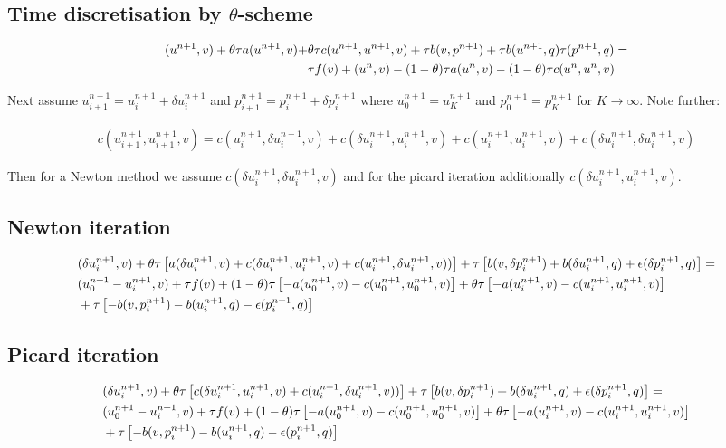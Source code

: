 \documentclass[11pt]{article}
\begin{document}
\subsection{Time discretisation by $\theta$-scheme}
\begin{align}
	(u^{n+1}, v) + \theta \tau a(u^{n+1}, v) +& \theta \tau c(u^{n+1},u^{n+1},v) + \tau b(v,p^{n+1}) + \tau b(u^{n+1},q) \tau (p^{n+1},q) =\notag \\ 
	&\tau f(v) + (u^{n}, v) -(1-\theta) \tau a(u^{n}, v) - (1-\theta) \tau c(u^{n},u^{n},v)
\end{align}

Next assume $u_{i+1}^{n+1}=u_i^{n+1} + \delta u_i^{n+1}$ and $p_{i+1}^{n+1}=p_i^{n+1} + \delta p_i^{n+1}$ where $u^{n+1}_0 = u^{n+1}_K$ and  $p^{n+1}_0 = p^{n+1}_K$ for $K\rightarrow \infty$. 
Note further:

\begin{align}
c(u^{n+1}_{i+1},u^{n+1}_{i+1},v) = c(u^{n+1}_{i},\delta u^{n+1}_{i},v) + c(\delta u^{n+1}_{i},u^{n+1}_{i},v) +c(u^{n+1}_{i},u^{n+1}_{i},v) +c(\delta u^{n+1}_{i},\delta u^{n+1}_{i},v)
\end{align}

Then for a Newton method we assume $c(\delta u^{n+1}_{i},\delta u^{n+1}_{i},v)$ and for the picard iteration additionally $c(\delta u^{n+1}_{i},u^{n+1}_{i},v)$.

\subsection{Newton iteration}
\begin{align}
	&(\delta u^{n+1}_i, v) + \theta \tau \left[ a(\delta u^{n+1}_i, v) + c(\delta u^{n+1}_i,u^{n+1}_i,v)+c(u^{n+1}_i,\delta u^{n+1}_i,v) )\right] + \tau\left[ b(v,\delta p^{n+1}_i) + b(\delta u^{n+1}_i,q) + \epsilon (\delta p^{n+1}_i,q)\right] = \notag \\ 
	&(u^{n+1}_0 -u^{n+1}_i , v) + \tau f(v) + (1-\theta) \tau \left[-a(u^{n+1}_0, v) -  c(u^{n+1}_0,u^{n+1}_0,v)\right] 
	+ \theta \tau\left[- a(u^{n+1}_i, v) - c(u^{n+1}_i,u^{n+1}_i,v)\right]\notag \\ 
	&+ \tau\left[-b(v,p^{n+1}_i) - b(u^{n+1}_i,q) - \epsilon (p^{n+1}_i,q) \right]
\end{align}
\subsection{Picard iteration}
\begin{align}
	&(\delta u^{n+1}_i, v) + \theta \tau\left[ c(\delta u^{n+1}_i,u^{n+1}_i,v)+c(u^{n+1}_i,\delta u^{n+1}_i,v) )\right] + \tau\left[ b(v,\delta p^{n+1}_i) + b(\delta u^{n+1}_i,q) + \epsilon (\delta p^{n+1}_i,q)\right] = \notag \\ 
	&(u^{n+1}_0 -u^{n+1}_i , v) + \tau f(v) + (1-\theta) \tau \left[-a(u^{n+1}_0, v) -  c(u^{n+1}_0,u^{n+1}_0,v)\right] 
	+ \theta \tau\left[- a(u^{n+1}_i, v) - c(u^{n+1}_i,u^{n+1}_i,v)\right]\notag \\ 
	&+ \tau\left[-b(v,p^{n+1}_i) - b(u^{n+1}_i,q) - \epsilon (p^{n+1}_i,q) \right]
\end{align}
\end{document}
